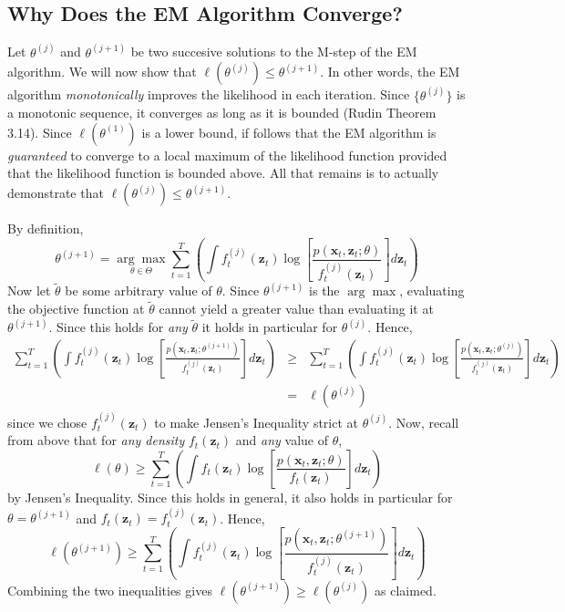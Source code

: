 \documentclass[12pt]{article}
\theoremstyle{definition}
\begin{document}
\subsection{Why Does the EM Algorithm Converge?}
Let $\theta^{(j)}$ and $\theta^{(j+1)}$ be two succesive solutions to the M-step of the EM algorithm. We will now show that $\ell(\theta^{(j)}) \leq \theta^{(j+1)}$. In other words, the EM algorithm \emph{monotonically} improves the likelihood in each iteration. Since $\{\theta^{(j)}\}$ is a monotonic sequence, it converges as long as it is bounded (Rudin Theorem 3.14). Since $\ell(\theta^{(1)})$ is a lower bound, if follows that the EM algorithm is \emph{guaranteed} to converge to a local maximum of the likelihood function provided that the likelihood function is bounded above. All that remains is to actually demonstrate that $\ell(\theta^{(j)}) \leq \theta^{(j+1)}$.

By definition, 
	$$\theta^{(j+1)} = \underset{\theta \in \Theta}{\arg \max} \sum_{t = 1}^T  \left(\int f_t^{(j)}(\mathbf{z}_t) \log\left[\frac{p(\textbf{x}_t,\textbf{z}_t;\theta)}{f_t^{(j)}(\mathbf{z}_t)}\right]d \textbf{z}_t \right)$$ 
Now let $\tilde{\theta}$ be some arbitrary value of $\theta$. Since $\theta^{(j+1)}$ is the $\arg \max$, evaluating the objective function at $\tilde{\theta}$ cannot yield a greater value than evaluating it at $\theta^{(j+1)}$. Since this holds for \emph{any} $\tilde{\theta}$ it holds in particular for $\theta^{(j)}$. Hence, 
	\begin{eqnarray*}
		\sum_{t = 1}^T  \left(\int f_t^{(j)}(\mathbf{z}_t) \log\left[\frac{p(\textbf{x}_t,\textbf{z}_t;\theta^{(j+1)})}{f_t^{(j)}(\mathbf{z}_t)}\right] d \textbf{z}_t \right) 
		&\geq& 
		\sum_{t = 1}^T  \left(\int f_t^{(j)}(\mathbf{z}_t) \log\left[\frac{p(\textbf{x}_t,\textbf{z}_t;\theta^{(j)})}{f_t^{(j)}(\mathbf{z}_t)}\right] d \textbf{z}_t \right)\\
		&=& \ell(\theta^{(j)})
	\end{eqnarray*}
since we chose $f^{(j)}_t(\mathbf{z}_t)$ to make Jensen's Inequality strict at $\theta^{(j)}$. Now, recall from above that for \emph{any density} $f_t(\mathbf{z}_t)$ and \emph{any} value of $\theta$,
	$$\ell(\theta) \geq \sum_{t=1}^T \left(\int f_t(\mathbf{z}_t) \log\left[\frac{p(\textbf{x}_t,\textbf{z}_t;\theta)}{f_t(\mathbf{z}_t)}\right] d \textbf{z}_t \right)$$
by Jensen's Inequality. Since this holds in general, it also holds in particular for $\theta = \theta^{(j+1)}$ and $f_t(\mathbf{z}_t)= f_t^{(j)}(\mathbf{z}_t)$. Hence,
	$$\ell(\theta^{(j+1)}) \geq \sum_{t=1}^T \left(\int f_t^{(j)}(\mathbf{z}_t) \log\left[\frac{p(\textbf{x}_t,\textbf{z}_t;\theta^{(j+1)})}{f_t^{(j)}(\mathbf{z}_t)}\right] d \textbf{z}_t \right)$$
Combining the two inequalities gives $\ell(\theta^{(j+1)}) \geq \ell(\theta^{(j)})$ as claimed.
\end{document}
